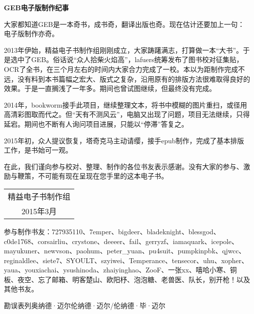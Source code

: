 \clearpage

\begin{center}\bfseries\large
GEB电子版制作纪事
\end{center}

\bigskip

\kaishu\small

大家都知道GEB是一本奇书，成书奇，翻译出版也奇。现在估计还要加上一句：电子版制作亦奇。

2013年伊始，精益电子书制作组刚刚成立，大家踌躇满志，打算做一本“大书”。于是选中了GEB。俗话说“众人拾柴火焰高”，lafuers统筹发布了图书校对征集贴，OCR了全书，在三个月左右的时间内大家合力完成了一校。本以为距制作完成不远，没有料到本书篇幅之宏大、版式之复杂，沿用原有的排版方法很难取得良好的效果。于是一直搁浅了一年多。期间也曾试图继续，但最终没有完成。

2014年，bookworm接手此项目，继续整理文本，将书中模糊的图片重扫，或径用高清彩图取而代之。但“天有不测风云”，电脑又出现了问题，项目无法继续，只得延宕。期间也不断有人询问项目进展，只能以“停滞”答复之。

2015年初，众人提议恢复，塔奇克马主动请缨，接手epub制作，完成了基本排版工作，是书始可一观。

在此，我们谨向参与校对、整理、制作的各位书友表示感谢。没有大家的参与、激励与鞭策，不可能有现在呈现在您手里的这本电子书。

\medskip

\hfill
\begin{tabular}{c@{\qquad}}
精益电子书制作组\\
2015年3月
\end{tabular}

\vfill

\normalfont
\textsf{参与制作书友}：727935110、7emper、bigdeer、bladeknight、blessgod、c0de1768、corsairliu、crystone、deeeer、fail、gerryzf、iamaquark、icepole、mayukuner、newvson、paohum、peter\_yuan、pu4suit、pumpkinpbk、qjwcc、reginaldlee、siete7、SYOULT、szyiwei、Temperance、tensecor、uhu、xopher、yaua、youxiachai、ysushinoda、zhaiyinghao、ZooF、一张xx、嘻哈小寒、铜板、夜空、忘了邮箱、明客楚山、欧阳杼、泡泡糖、老兽医、队长，别开枪！以及其他书友。

\textsf{勘误表}\quad 列奥纳德·迈尔\quad 伦纳德·迈尔/伦纳德·毕·迈尔

\clearpage
\endgroup

